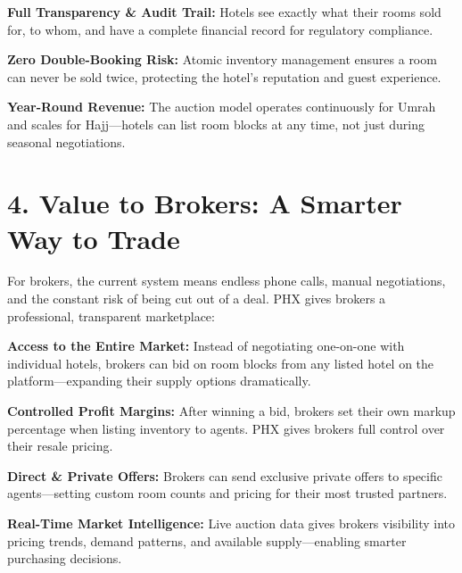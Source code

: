 \documentclass[11pt,a4paper]{article}
\begin{document}
\vspace{0.3cm}

\textbf{Full Transparency \& Audit Trail:} Hotels see exactly what their rooms sold for, to whom, and have a complete financial record for regulatory compliance.

\vspace{0.3cm}

\textbf{Zero Double-Booking Risk:} Atomic inventory management ensures a room can never be sold twice, protecting the hotel's reputation and guest experience.

\vspace{0.3cm}

\textbf{Year-Round Revenue:} The auction model operates continuously for Umrah and scales for Hajj---hotels can list room blocks at any time, not just during seasonal negotiations.

\section*{4. Value to Brokers: A Smarter Way to Trade}


For brokers, the current system means endless phone calls, manual negotiations, and the constant risk of being cut out of a deal. PHX gives brokers a professional, transparent marketplace:


\vspace{0.3cm}

\textbf{Access to the Entire Market:} Instead of negotiating one-on-one with individual hotels, brokers can bid on room blocks from any listed hotel on the platform---expanding their supply options dramatically.

\vspace{0.3cm}

\textbf{Controlled Profit Margins:} After winning a bid, brokers set their own markup percentage when listing inventory to agents. PHX gives brokers full control over their resale pricing.

\vspace{0.3cm}

\textbf{Direct \& Private Offers:} Brokers can send exclusive private offers to specific agents---setting custom room counts and pricing for their most trusted partners.

\vspace{0.3cm}

\textbf{Real-Time Market Intelligence:} Live auction data gives brokers visibility into pricing trends, demand patterns, and available supply---enabling smarter purchasing decisions.
\end{document}
